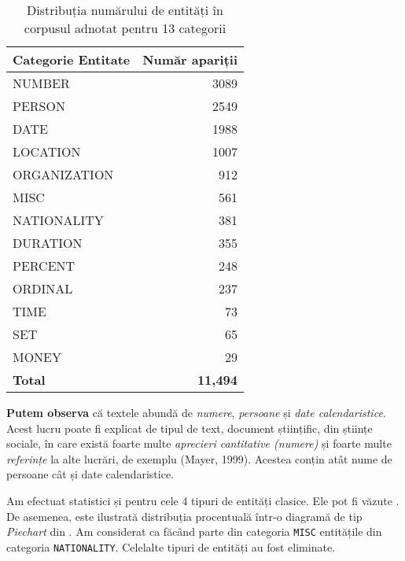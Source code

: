 \begin{center}
\begin{table}[htb]
  \caption{Distribuția numărului de entități în corpusul adnotat pentru 13 categorii}
  \begin{tabular}{|l|r|}
  \hline
   Categorie Entitate & Număr apariții\\
   \hline
   
 NUMBER	&	3089	\\
 PERSON	&	2549	\\
 DATE	&	1988	\\
 LOCATION	&	1007	\\
 ORGANIZATION	&	912	\\
 MISC	&	561	\\
 NATIONALITY	&	381	\\
 DURATION	&	355	\\
 PERCENT	&	248	\\
 ORDINAL	&	237	\\
 TIME	&	73	\\
 SET	&	65	\\
 MONEY	&	29	\\
  
   \hline
   \textbf{Total} 	&	\textbf{11,494} \\
   \hline
   
  \end{tabular}
  \label{table:top-entites-13-categories}
\end{table}
\end{center}


\textbf{Putem observa} că textele abundă de \textit{numere}, \textit{persoane} și \textit{date calendaristice}. Acest lucru poate fi explicat de tipul de text, document științific, din științe sociale, în care există foarte multe \textit{aprecieri cantitative (numere)} și foarte multe \textit{referințe} la alte lucrări, de exemplu (Mayer, 1999). Acestea conțin atât nume de persoane cât și date calendaristice.

Am efectuat statistici și pentru cele 4 tipuri de entități clasice. Ele pot fi văzute . De asemenea, este ilustrată distribuția procentuală într-o diagramă de tip \textit{Piechart} din . Am considerat ca făcând parte din categoria \texttt{MISC} entitățile din categoria \texttt{NATIONALITY}. Celelalte tipuri de entități au fost eliminate. 



